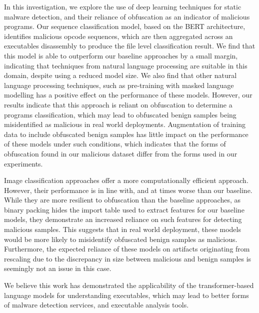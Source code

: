 \documentclass[main.tex]{subfiles}
\begin{document}
In this investigation, we explore the use of deep learning techniques for static malware detection, and their reliance of obfuscation as an indicator of malicious programs. Our sequence classification model, based on the BERT architecture, identifies malicious opcode sequences, which are then aggregated across an executables disassembly to produce the file level classification result. We find that this model is able to outperform our baseline approaches by a small margin, indicating that techniques from natural language processing are suitable in this domain, despite using a reduced model size. We also find that other natural language processing techniques, such as pre-training with masked language modelling has a positive effect on the performance of these models. However, our results indicate that this approach is reliant on obfuscation to determine a programs classification, which may lead to obfuscated benign samples being misidentified as malicious in real world deployments. Augmentation of training data to include obfuscated benign samples has little impact on the performance of these models under such conditions, which indicates that the forms of obfuscation found in our malicious dataset differ from the forms used in our experiments. 

Image classification approaches offer a more computationally efficient approach. However, their performance is in line with, and at times worse than our baseline. While they are more resilient to obfuscation than the baseline approaches, as binary packing hides the import table used to extract features for our baseline models, they demonstrate an increased reliance on such features for detecting malicious samples. This suggests that in real world deployment, these models would be more likely to misidentify obfuscated benign samples as malicious. Furthermore, the expected reliance of these models on artifacts originating from rescaling due to the discrepancy in size between malicious and benign samples is seemingly not an issue in this case. 

We believe this work has demonstrated the applicability of the transformer-based language models for understanding executables, which may lead to better forms of malware detection services, and executable analysis tools. 
\end{document}
